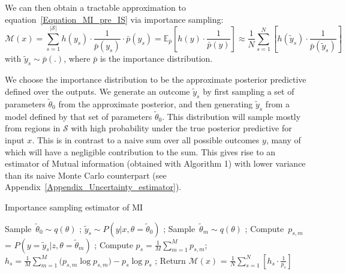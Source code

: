 We can then obtain a tractable approximation to equation~\ref{Equation_MI_pre_IS} via importance sampling:
\vspace{-2mm}
\begin{equation}
\mathcal{M}(x) = \sum_{s=1}^{|\mathcal{S}|} h(y_s) \cdot \frac{1}{\bar{p}(y_s)} \cdot \bar{p}(y_s) = \mathbb{E}_{\bar{p}}{\left[h(y) \cdot \frac{1}{\bar{p}(y)}\right]}
\approx \frac{1}{N} \sum_{s=1}^N {\left[h(\tilde{y}_s) \cdot \frac{1}{\bar{p}(\tilde{y}_s)}\right]}
\end{equation}
\label{Sec3_Equation_IS_MI}
with $\tilde{y}_s \sim \bar{p}(.)$, where $\bar{p}$ is the importance distribution.

We choose the importance distribution to be the approximate posterior predictive defined over the outputs. We generate an outcome $\tilde{y}_s$ by first sampling a set of parameters $\tilde{\theta}_{0}$ from the approximate posterior, and then generating $\tilde{y}_s$ from a model defined by that set of parameters $\tilde{\theta}_{0}$.
This distribution will sample mostly from regions in $\mathcal{S}$ with high probability under the true posterior predictive for input $x$. This is in contrast to a naive sum over all possible outcomes $y$, many of which will have a negligible contribution to the sum. This gives rise to an estimator of Mutual information (obtained with Algorithm 1) with lower variance than its naive Monte Carlo counterpart (see Appendix~\ref{Appendix_Uncertainty_estimator}).

\begin{algorithm}[h]
\label{Sec3_Algorithm_IS-MI}
\begin{algorithmic}
\caption{Importance sampling estimator of MI} 
	    \STATE Sample\ $\tilde{\theta}_{0} \sim q(\theta)$ ; $\tilde{y}_s \sim P(y|x,\theta=\tilde{\theta}_{0})$ ; 
	        \STATE Sample\ $\tilde{\theta}_m \sim q(\theta)$ ; Compute\ $p_{s,m}$ = $P(y=\tilde{y}_s|z,\theta=\tilde{\theta}_m)$ ;
		\ENDFOR
	    \STATE Compute $p_s = \frac{1}{M}\sum_{m=1}^M{p_{s,m}}$; $h_s = \frac{1}{M}\sum_{m=1}^M({p_{s,m} \log p_{s,m})} - p_s \log p_s$ ;
	\ENDFOR
	\STATE Return $\mathcal{M}(x)$ = $\frac{1}{N} \sum_{s=1}^{N} \left[h_s \cdot \frac{1}{p_s} \right]$ \\
\end{algorithmic}
\end{algorithm}